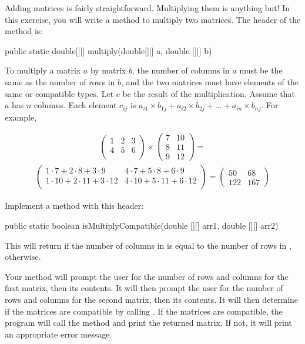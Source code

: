 \begin{exercise}
Adding matrices is fairly straightforward. Multiplying them is anything but! In this exercise, you will write a method to multiply two matrices. The header of the method is:

\begin{code}
public static double[][] multiply(double[][] a, double [][] b)
\end{code}

To multiply a matrix $a$ by matrix $b$, the number of columns in $a$ must be the same as the number of rows in $b$, and the two matrices must have elements of the same or compatible types. Let $c$ be the result of the multiplication. Assume that $a$ has $n$ columns. Each element $c_{ij}$ is $a_{i1} \times b_{1j} + a_{i2} \times b_{2j} + ... + a_{in} \times b_{nj}$. For example,

\begin{align*}
\begin{pmatrix}
1 & 2 & 3 \\
4 & 5 & 6 \\
\end{pmatrix}
\times
\begin{pmatrix}
7 & 10 \\
8 & 11 \\
9 & 12
\end{pmatrix}
=
\end{align*}
\begin{align*}
\begin{pmatrix}
1\cdot 7+2\cdot 8+3\cdot 9 & 4\cdot 7+5\cdot 8+6\cdot 9\\
1\cdot 10+2\cdot 11+3\cdot 12 &  4\cdot 10+5\cdot 11+6\cdot 12\\
\end{pmatrix}
=
\begin{pmatrix}
50 & 68\\
122 & 167
\end{pmatrix}
\end{align*}

Implement a method with this header:

\begin{code}
public static boolean isMultiplyCompatible(double [][] arr1,
    double [][] arr2)
\end{code}

This will return  if the number of columns in  is equal to the number of rows in ,  otherwise.

Your  method will prompt the user for the number of rows and columns for the first matrix, then its contents. It will then prompt the user for the number of rows and columns for the second matrix, then its contents. It will then determine if the matrices are compatible by calling . If the matrices are compatible, the program will call the  method and print the returned matrix. If not, it will print an appropriate error message.


\end{exercise}

